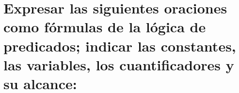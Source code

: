 \chapter*{Expresar las siguientes oraciones como fórmulas de la lógica de predicados; indicar las constantes, las variables, los cuantificadores y su alcance:}